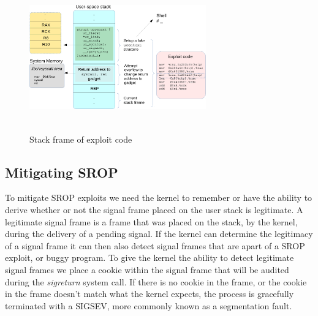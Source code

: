 \documentclass{sig-alternate-05-2015}
\begin{document}
\begin{figure}
\centering
\includegraphics[height=2.5in, width=3in]{5.pdf}
\caption{Stack frame of exploit code}
\label{fig:SFEC}
\end{figure}

\subsection{Mitigating SROP}
To mitigate SROP exploits we need the kernel to remember or have the ability to derive whether or not the signal frame placed on the user stack is legitimate. A legitimate signal frame is a frame that was placed on the stack, by the kernel, during the delivery of a pending signal. If the kernel can determine the legitimacy of a signal frame it can then also detect signal frames that are apart of a SROP exploit, or buggy program. To give the kernel the ability to detect legitimate signal frames we place a cookie within the signal frame that will be audited during the \textit{sigreturn} system call. If there is no cookie in the frame, or the cookie in the frame doesn't match what the kernel expects, the process is gracefully terminated with a SIGSEV, more commonly known as a segmentation fault.
\end{document}
